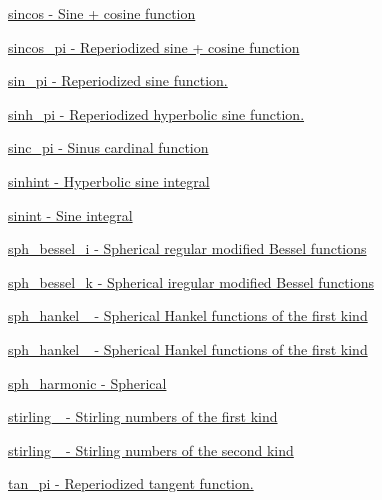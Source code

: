 \begin{DoxyItemize}
\item \hyperlink{group__gnu__math__spec__func_ga8041c24b528475bcf8a4178e484652a3}{sincos -\/ Sine + cosine function}
\item \hyperlink{group__gnu__math__spec__func_ga6553883f127ea0de67041c3128e03813}{sincos\+\_\+pi -\/ Reperiodized sine + cosine function}
\item \hyperlink{group__gnu__math__spec__func_ga220f8a9a0477697cff96e84dc911d5f0}{sin\+\_\+pi -\/ Reperiodized sine function.}
\item \hyperlink{group__gnu__math__spec__func_gade43453b87b6b38c05b3fcce40870542}{sinh\+\_\+pi -\/ Reperiodized hyperbolic sine function.}
\item \hyperlink{group__gnu__math__spec__func_ga5195270024403b985e7d4f2f935f8779}{sinc\+\_\+pi -\/ Sinus cardinal function}
\item \hyperlink{group__gnu__math__spec__func_gab5cbc831c5fab99a967c03d059f1ad59}{sinhint -\/ Hyperbolic sine integral}
\item \hyperlink{group__gnu__math__spec__func_ga076c8d52588904f5711c41781f8acfa0}{sinint -\/ Sine integral}
\item \hyperlink{group__gnu__math__spec__func_ga156b8154b27b7898c8b2abf4284f7323}{sph\+\_\+bessel\+\_\+i -\/ Spherical regular modified Bessel functions}
\item \hyperlink{group__gnu__math__spec__func_ga288b28f2c6995d052a4f5f17293cbf1a}{sph\+\_\+bessel\+\_\+k -\/ Spherical iregular modified Bessel functions}
\item \hyperlink{group__gnu__math__spec__func_ga4424f565fb224ab88b177beb65d08305}{sph\+\_\+hankel\+\_ -\/ Spherical Hankel functions of the first kind}
\item \hyperlink{group__gnu__math__spec__func_ga1ca08866a25e3637b04c57ff5a0c36a5}{sph\+\_\+hankel\+\_ -\/ Spherical Hankel functions of the first kind}
\item \hyperlink{group__gnu__math__spec__func_gacbff28988d5d36f0c3b3fe03d4f57896}{sph\+\_\+harmonic -\/ Spherical}
\item \hyperlink{group__gnu__math__spec__func_ga2b955dac7d2c5125f2091eaeb25c8ad2}{stirling\+\_ -\/ Stirling numbers of the first kind}
\item \hyperlink{group__gnu__math__spec__func_ga3761c0e467cbe45cbda66a4e796adcd3}{stirling\+\_ -\/ Stirling numbers of the second kind}
\item \hyperlink{group__gnu__math__spec__func_ga12855bd62fe6a955ef0d1d5e92c85ba9}{tan\+\_\+pi -\/ Reperiodized tangent function.}

\end{DoxyItemize}
